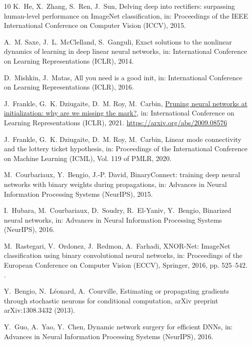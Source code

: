 \documentclass[final,5p,times,twocolumn]{elsarticle}
\theoremstyle{remark}
\begin{document}
\begin{thebibliography}{10}
K.~He, X.~Zhang, S.~Ren, J.~Sun, {Delving deep into rectifiers: surpassing
  human-level performance on ImageNet classification}, in: Proceedings of the
  IEEE International Conference on Computer Vision (ICCV), 2015.

A.~M. Saxe, J.~L. McClelland, S.~Ganguli, {Exact solutions to the nonlinear
  dynamics of learning in deep linear neural networks}, in: International
  Conference on Learning Representations (ICLR), 2014.

D.~Mishkin, J.~Matas, {All you need is a good init}, in: International
  Conference on Learning Representations (ICLR), 2016.

J.~Frankle, G.~K. Dziugaite, D.~M. Roy, M.~Carbin,
  \href{https://arxiv.org/abs/2009.08576}{{Pruning neural networks at
  initialization: why are we missing the mark?}}, in: International Conference
  on Learning Representations (ICLR), 2021.
\newline\urlprefix\url{https://arxiv.org/abs/2009.08576}

J.~Frankle, G.~K. Dziugaite, D.~M. Roy, M.~Carbin, {Linear mode connectivity
  and the lottery ticket hypothesis}, in: Proceedings of the International
  Conference on Machine Learning (ICML), Vol. 119 of PMLR, 2020.

M.~Courbariaux, Y.~Bengio, J.-P. David, {BinaryConnect: training deep neural
  networks with binary weights during propagations}, in: Advances in Neural
  Information Processing Systems (NeurIPS), 2015.

I.~Hubara, M.~Courbariaux, D.~Soudry, R.~El-Yaniv, Y.~Bengio, {Binarized neural
  networks}, in: Advances in Neural Information Processing Systems (NeurIPS),
  2016.

M.~Rastegari, V.~Ordonez, J.~Redmon, A.~Farhadi, {XNOR-Net: ImageNet
  classification using binary convolutional neural networks}, in: Proceedings
  of the European Conference on Computer Vision (ECCV), Springer, 2016, pp.
  525--542.
\newblock \href {https://doi.org/10.1007/978-3-319-46493-0_32}
  {}.

Y.~Bengio, N.~L{\'e}onard, A.~Courville, {Estimating or propagating gradients
  through stochastic neurons for conditional computation}, arXiv preprint
  arXiv:1308.3432 (2013).

Y.~Guo, A.~Yao, Y.~Chen, {Dynamic network surgery for efficient DNNs}, in:
  Advances in Neural Information Processing Systems (NeurIPS), 2016.


\end{thebibliography}
\end{document}
